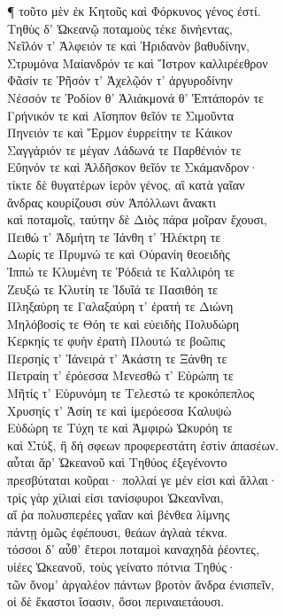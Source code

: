 ¶ τοῦτο μὲν ἐκ Κητοῦς καὶ Φόρκυνος γένος ἐστί. \\
Τηθὺς δ' Ὠκεανῷ ποταμοὺς τέκε δινήεντας,\\
Νεῖλόν τ' Ἀλφειόν τε καὶ Ἠριδανὸν βαθυδίνην,\\
Στρυμόνα Μαίανδρόν τε καὶ Ἴστρον καλλιρέεθρον\\
Φᾶσίν τε Ῥῆσόν τ' Ἀχελῷόν τ' ἀργυροδίνην \\
Νέσσόν τε Ῥοδίον θ' Ἁλιάκμονά θ' Ἑπτάπορόν τε\\
Γρήνικόν τε καὶ Αἴσηπον θεῖόν τε Σιμοῦντα\\
Πηνειόν τε καὶ Ἕρμον ἐυρρείτην τε Κάικον\\
Σαγγάριόν τε μέγαν Λάδωνά τε Παρθένιόν τε\\
Εὔηνόν τε καὶ Ἀλδῆσκον θεῖόν τε Σκάμανδρον· \\
τίκτε δὲ θυγατέρων ἱερὸν γένος, αἳ κατὰ γαῖαν\\
ἄνδρας κουρίζουσι σὺν Ἀπόλλωνι ἄνακτι\\
καὶ ποταμοῖς, ταύτην δὲ Διὸς πάρα μοῖραν ἔχουσι,\\
Πειθώ τ' Ἀδμήτη τε Ἰάνθη τ' Ἠλέκτρη τε\\
Δωρίς τε Πρυμνώ τε καὶ Οὐρανίη θεοειδὴς \\
Ἱππώ τε Κλυμένη τε Ῥόδειά τε Καλλιρόη τε\\
Ζευξώ τε Κλυτίη τε Ἰδυῖά τε Πασιθόη τε\\
Πληξαύρη τε Γαλαξαύρη τ' ἐρατή τε Διώνη\\
Μηλόβοσίς τε Θόη τε καὶ εὐειδὴς Πολυδώρη \\
Κερκηίς τε φυὴν ἐρατὴ Πλουτώ τε βοῶπις \\
Περσηίς τ' Ἰάνειρά τ' Ἀκάστη τε Ξάνθη τε\\
Πετραίη τ' ἐρόεσσα Μενεσθώ τ' Εὐρώπη τε\\
Μῆτίς τ' Εὐρυνόμη τε Τελεστώ τε κροκόπεπλος\\
Χρυσηίς τ' Ἀσίη τε καὶ ἱμερόεσσα Καλυψὼ\\
Εὐδώρη τε Τύχη τε καὶ Ἀμφιρὼ Ὠκυρόη τε \\
καὶ Στύξ, ἣ δή σφεων προφερεστάτη ἐστὶν ἁπασέων.\\
αὗται ἄρ' Ὠκεανοῦ καὶ Τηθύος ἐξεγένοντο\\
πρεσβύταται κοῦραι· πολλαί γε μέν εἰσι καὶ ἄλλαι·\\
τρὶς γὰρ χίλιαί εἰσι τανίσφυροι Ὠκεανῖναι,\\
αἵ ῥα πολυσπερέες γαῖαν καὶ βένθεα λίμνης \\
πάντῃ ὁμῶς ἐφέπουσι, θεάων ἀγλαὰ τέκνα. \\
τόσσοι δ' αὖθ' ἕτεροι ποταμοὶ καναχηδὰ ῥέοντες,\\
υἱέες Ὠκεανοῦ, τοὺς γείνατο πότνια Τηθύς· \\
τῶν ὄνομ' ἀργαλέον πάντων βροτὸν ἄνδρα ἐνισπεῖν, \\
οἱ δὲ ἕκαστοι ἴσασιν, ὅσοι περιναιετάουσι.  

